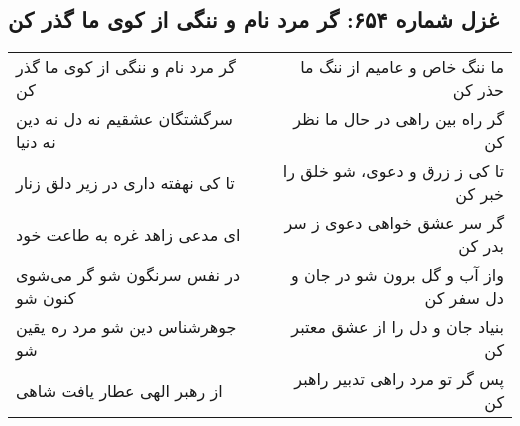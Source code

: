 \begin{center}
\section*{غزل شماره ۶۵۴: گر مرد نام و ننگی از کوی ما گذر کن}
\label{sec:654}
\begin{longtable}{l p{0.5cm} r}
گر مرد نام و ننگی از کوی ما گذر کن
&&
ما ننگ خاص و عامیم از ننگ ما حذر کن
\\
سرگشتگان عشقیم نه دل نه دین نه دنیا
&&
گر راه بین راهی در حال ما نظر کن
\\
تا کی نهفته داری در زیر دلق زنار
&&
تا کی ز زرق و دعوی، شو خلق را خبر کن
\\
ای مدعی زاهد غره به طاعت خود
&&
گر سر عشق خواهی دعوی ز سر بدر کن
\\
در نفس سرنگون شو گر می‌شوی کنون شو
&&
واز آب و گل برون شو در جان و دل سفر کن
\\
جوهرشناس دین شو مرد ره یقین شو
&&
بنیاد جان و دل را از عشق معتبر کن
\\
از رهبر الهی عطار یافت شاهی
&&
پس گر تو مرد راهی تدبیر راهبر کن
\\
\end{longtable}
\end{center}
